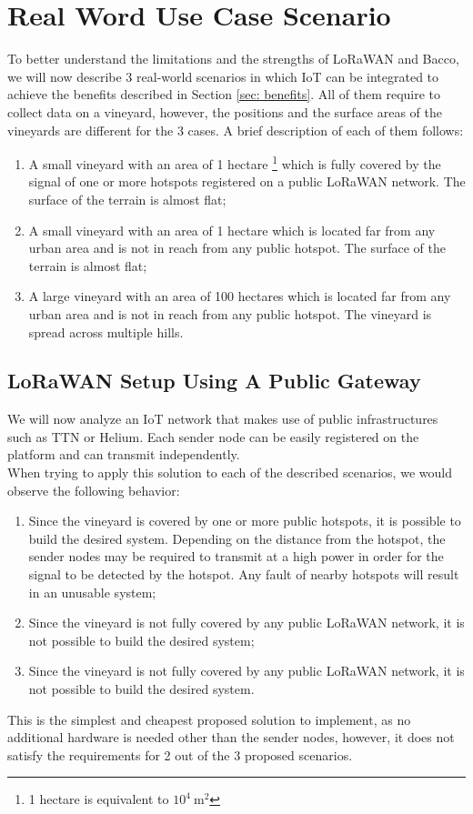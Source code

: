 \section{Real Word Use Case Scenario}
To better understand the limitations and the strengths of LoRaWAN and Bacco, we will now describe 3 real-world scenarios
in which \gls{IoT} can be integrated to achieve the benefits described in Section \ref{sec: benefits}. All of them
require to collect data on a vineyard, however, the positions and the surface areas of the vineyards are
different for the 3 cases. A brief description of each of them follows:
\begin{enumerate}
    \item A small vineyard with an area of 1 hectare \footnote{1 hectare is equivalent to $10^4~\mathrm{m^2}$} which is
        fully covered by the signal of one or more hotspots registered on a public LoRaWAN
        network. The surface of the terrain is almost flat;
    \item A small vineyard with an area of 1 hectare which is located far from any urban area and is not
        in reach from any public hotspot. The surface of the terrain is almost flat;
    \item A large vineyard with an area of 100 hectares which is located far from any urban area and is not in reach
        from any public hotspot. The vineyard is spread across multiple hills.
\end{enumerate}

\subsection{LoRaWAN Setup Using A Public Gateway}
We will now analyze an \gls{IoT} network that makes use of public infrastructures such as
\gls{TTN} or Helium. Each sender node can be easily registered on the platform and can transmit independently.\\
When trying to apply this solution to each of the described scenarios, we would observe the following behavior:
\begin{enumerate}
    \item Since the vineyard is covered by one or more public hotspots, it is possible to build the desired system.
        Depending on the distance from the hotspot, the sender nodes may be required to transmit at a high power in
        order for the signal to be detected by the hotspot. Any fault of nearby hotspots will result in an unusable
        system;
    \item Since the vineyard is not fully covered by any public LoRaWAN network, it is not possible to build the desired
        system;
    \item Since the vineyard is not fully covered by any public LoRaWAN network, it is not possible to build the desired
        system.
\end{enumerate}
This is the simplest and cheapest proposed solution to implement, as no additional hardware is needed other than the
sender nodes, however, it does not satisfy the requirements for 2 out of the 3 proposed scenarios.

